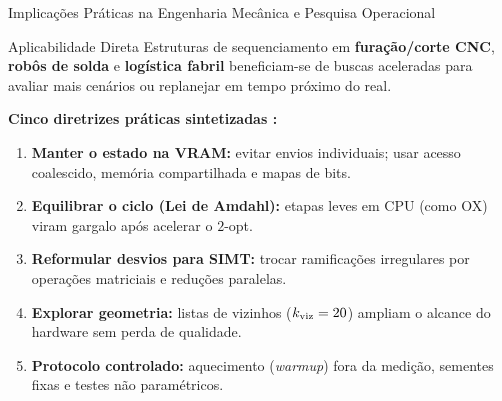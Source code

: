 \begin{frame}{Implicações Práticas na Engenharia Mecânica e Pesquisa Operacional}
  \begin{block}{Aplicabilidade Direta}
    Estruturas de sequenciamento em \textbf{furação/corte CNC}, \textbf{robôs de solda} e \textbf{logística fabril} beneficiam-se de buscas aceleradas para avaliar mais cenários ou replanejar em tempo próximo do real.
  \end{block}

  \vspace{0.1cm}
  {\small\textbf{Cinco diretrizes práticas sintetizadas \autocite{kirk2010programming,schulz2013gpu,oneil2015rethinking,nvidia2024cuda}:}}
  \begin{enumerate}
    \small
    \item \textbf{Manter o estado na VRAM:} evitar envios individuais; usar acesso coalescido, memória compartilhada e mapas de bits.
    \item \textbf{Equilibrar o ciclo (Lei de Amdahl):} etapas leves em CPU (como OX) viram gargalo após acelerar o $2$-opt.
    \item \textbf{Reformular desvios para SIMT:} trocar ramificações irregulares por operações matriciais e reduções paralelas.
    \item \textbf{Explorar geometria:} listas de vizinhos ($k_{\text{viz}}=20$) ampliam o alcance do hardware sem perda de qualidade.
    \item \textbf{Protocolo controlado:} aquecimento (\emph{warmup}) fora da medição, sementes fixas e testes não paramétricos.
  \end{enumerate}
\end{frame}

